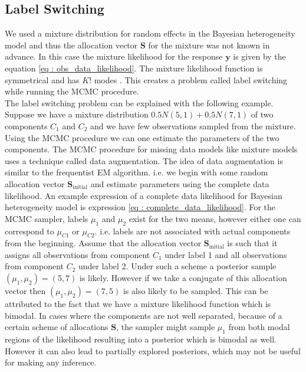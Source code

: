 \subsection{Label Switching}
\label{subsec : label_switching_blmm}
We used a mixture distribution for random effects in the Bayesian heterogeneity model and thus the allocation vector $\boldsymbol{S}$ for the mixture was not known in advance. In this case the mixture likelihood for the response $\boldsymbol{y}$ is given by the equation \ref{eq : obs_data_likelihood}. The mixture likelihood function is symmetrical and has $K!$ modes \citep[pg. 44]{fruhwirth-schnatter_finite_2013}. This creates a problem called label switching while running the MCMC procedure.\\

The label switching problem can be explained with the following example. Suppose we have a mixture distribution $0.5N(5,1) + 0.5N(7,1)$ of two components $C_1$ and $C_2$ and we have few observations sampled from the mixture. Using the MCMC procedure we can one estimate the parameters of the two components. The MCMC procedure for missing data models like mixture models uses a technique called data augmentation. The idea of data augmentation is similar to the frequentist EM algorithm. i.e. we begin with some random allocation vector $\boldsymbol{S}_\text{initial}$ and estimate parameters using the complete data likelihood. An example expression of a complete data likelihood for Bayesian heterogeneity model is expression \ref{eq : complete_data_likelihood}. For the MCMC sampler, labels $\mu_1$ and $\mu_2$ exist for the two means, however either one can correspond to $\mu_{C1}$ or $\mu_{C2}$. i.e. labels are not associated with actual components from the beginning. Assume that the allocation vector $\boldsymbol{S}_\text{initial}$ is such that it assigns all observations from component $C_1$ under label 1 and all observations from component $C_2$ under label 2. Under such a scheme a posterior sample $(\mu_1,\mu_2) = (5,7)$ is likely. However if we take a conjugate of this allocation vector then $(\mu_1,\mu_2) = (7,5)$ is also likely to be sampled. This can be attributed to the fact that we have a mixture likelihood function which is bimodal. In cases where the components are not well separated, because of a certain scheme of allocations $\boldsymbol{S}$, the sampler might sample $\mu_1$ from both modal regions of the likelihood resulting into a posterior which is bimodal as well. However it can also lead to partially explored posteriors, which may not be useful for making any inference.

